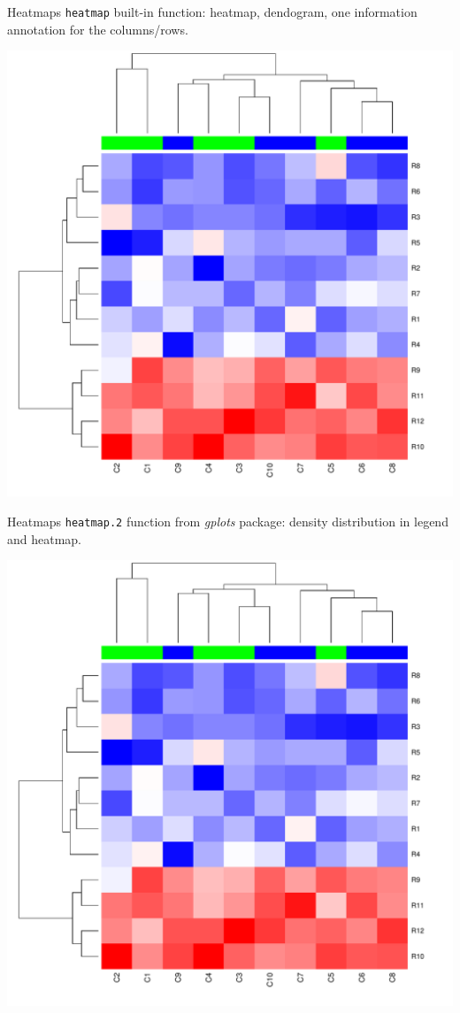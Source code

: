 \documentclass[10pt]{beamer}
\begin{document}
\begin{frame}[fragile]{Heatmaps}
  \verb!heatmap! built-in function: heatmap, dendogram, one information annotation for the columns/rows.
  \bigskip

  \centering
  \includegraphics[height=.8\textheight, page=1]{../imgs/heatmaps.pdf}

\end{frame}

\begin{frame}[fragile]{Heatmaps}
  \verb!heatmap.2! function from {\it gplots} package: density distribution in legend and heatmap.
  \bigskip

  \centering
  \includegraphics[height=.8\textheight, page=2]{../imgs/heatmaps.pdf}

\end{frame}
\end{document}
